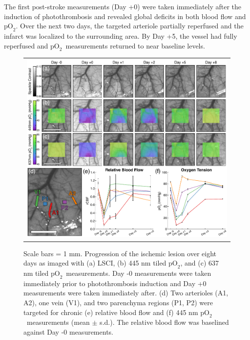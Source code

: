 \documentclass[12pt]{spieman}  %
\newcommand{\pO}{\ensuremath{\text{pO}_2}}
\begin{document}
\begin{spacing}{2}
The first post-stroke measurements (Day +0) were taken immediately after the induction of photothrombosis and revealed global deficits in both blood flow and \pO. Over the next two days, the targeted arteriole partially reperfused and the infarct was localized to the surrounding area. By Day +5, the vessel had fully reperfused and \pO\ measurements returned to near baseline levels.

\begin{figure}
    \begin{center}
        \begin{tabular}{c}
            \includegraphics[width=6.25in]{Figure6.pdf}
        \end{tabular}
    \end{center}
    \caption {
        \label{fig:chronic}
        Scale bars = 1 mm. Progression of the ischemic lesion over eight days as imaged with (a) LSCI, (b) 445 nm tiled \pO, and (c) 637 nm tiled \pO\ measurements. Day -0 measurements were taken immediately prior to photothrombosis induction and Day +0 measurements were taken immediately after. (d) Two arterioles (A1, A2), one vein (V1), and two parenchyma regions (P1, P2) were targeted for chronic (e) relative blood flow and (f) 445 nm \pO\ measurements (mean $\pm$ s.d.). The relative blood flow was baselined against Day -0 measurements.
    }
\end{figure}



\end{spacing}
\end{document}
